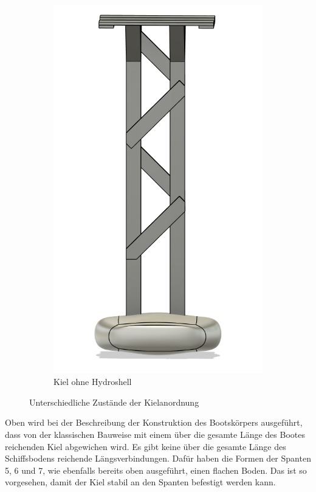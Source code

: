 \begin{figure}[H]
\begin{subfigure}[b]{0.39\linewidth}
        \includegraphics[width=\linewidth]{assets/kiel_2.png}
        \caption{Kiel ohne Hydroshell}
        \label{fig:kiel2}
    \end{subfigure}
    \caption{Unterschiedliche Zustände der Kielanordnung}
    \label{fig:kiel_comparison}
\end{figure}



Oben wird bei der Beschreibung der Konstruktion des Bootskörpers ausgeführt, dass von der klassischen Bauweise mit einem über die gesamte Länge des Bootes reichenden Kiel abgewichen wird. Es gibt keine über die gesamte Länge des Schiffsbodens reichende Längsverbindungen. Dafür haben die Formen der Spanten 5, 6 und 7, wie ebenfalls bereits oben ausgeführt, einen flachen Boden. Das ist so vorgesehen, damit der Kiel stabil an den Spanten befestigt werden kann.

